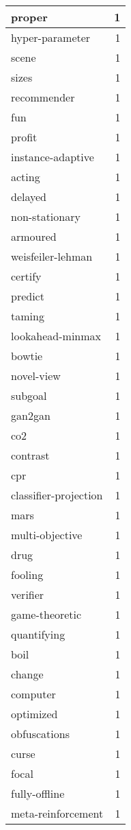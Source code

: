 \begin{table}[h]
\begin{tabular}{|l|r|}
\hline
proper & 1 \\
\hline
hyper-parameter & 1 \\
\hline
scene & 1 \\
\hline
sizes & 1 \\
\hline
recommender & 1 \\
\hline
fun & 1 \\
\hline
profit & 1 \\
\hline
instance-adaptive & 1 \\
\hline
acting & 1 \\
\hline
delayed & 1 \\
\hline
non-stationary & 1 \\
\hline
armoured & 1 \\
\hline
weisfeiler-lehman & 1 \\
\hline
certify & 1 \\
\hline
predict & 1 \\
\hline
taming & 1 \\
\hline
lookahead-minmax & 1 \\
\hline
bowtie & 1 \\
\hline
novel-view & 1 \\
\hline
subgoal & 1 \\
\hline
gan2gan & 1 \\
\hline
co2 & 1 \\
\hline
contrast & 1 \\
\hline
cpr & 1 \\
\hline
classifier-projection & 1 \\
\hline
mars & 1 \\
\hline
multi-objective & 1 \\
\hline
drug & 1 \\
\hline
fooling & 1 \\
\hline
verifier & 1 \\
\hline
game-theoretic & 1 \\
\hline
quantifying & 1 \\
\hline
boil & 1 \\
\hline
change & 1 \\
\hline
computer & 1 \\
\hline
optimized & 1 \\
\hline
obfuscations & 1 \\
\hline
curse & 1 \\
\hline
focal & 1 \\
\hline
fully-offline & 1 \\
\hline
meta-reinforcement & 1 \\

\end{tabular}
\end{table}
